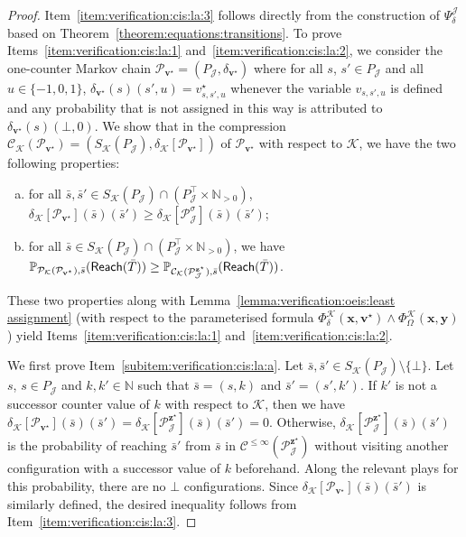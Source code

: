 \documentclass[a4paper,UKenglish,cleveref,autoref,thm-restate,colorlinks]{lipics-v2021}
\newcommand{\IN}{\mathbb{N}}
\newcommand{\INpos}{\IN_{>0}}
\newcommand{\mdpStateSpace}{S}
\newcommand{\weightVal}{u}
\newcommand{\ocCount}{k}
\newcommand{\ocConfig}{s}
\newcommand{\ocTrans}{\delta}
\newcommand{\mchain}{\mathcal{C}}
\newcommand{\ocChain}{\mathcal{P}}
\newcommand{\ocChainFin}[2]{\mchain^{\leq #2}(#1)}
\newcommand{\intPartB}{\mathcal{J}}
\newcommand{\intPartC}{\mathcal{K}}
\newcommand{\cisChainStrat}[1]{\ocChain^{#1}_{\intPartB}}
\newcommand{\cisChain}{\cisChainStrat{\strat}}
\newcommand{\cisChainStateSpace}{P_{\intPartB}}
\newcommand{\cisChainStateSpaceStar}{P_{\intPartB}^{\top}}
\newcommand{\compressCisStateSpace}{\mdpStateSpace_{\intPartC}({\cisChainStateSpace})}
\newcommand{\compressCisTrans}{\ocTrans_{\intPartC}[{\cisChain}]}
\newcommand{\cisConfig}{\bar{\ocConfig}}
\newcommand{\cisConfigB}{\bar{\ocConfig}'}
\newcommand{\varTrans}{x}
\newcommand{\varTransTuple}{\mathbf{\varTrans}}
\newcommand{\varObj}{y}
\newcommand{\varObjTuple}{\mathbf{\varObj}}
\newcommand{\varStrat}{z}
\newcommand{\solStratTuple}{\mathbf{\varStrat}^{\star}}
\newcommand{\varCis}{v}
\newcommand{\solCis}{\varCis^\star}
\newcommand{\solCisTuple}{\mathbf{\varCis}^\star}
\newcommand{\cisChainSymbSol}{\cisChainStrat{\solStratTuple}}
\newcommand{\compressCisSymbSol}{\mchain_{\intPartC}({\cisChainSymbSol})}
\newcommand{\compressCisTransSymbSol}{\ocTrans_{\intPartC}[{\cisChainSymbSol}]}
\newcommand{\formulaTransBase}{\Phi_{\ocTrans}}
\newcommand{\formulaObjBase}{\Phi_{\objective}}
\newcommand{\formulaCisBase}{\Psi_{\ocTrans}}
\newcommand{\formulaCis}{\formulaCisBase^\intPartB}
\newcommand{\formulaCisTrans}{\formulaTransBase^\intPartC}
\newcommand{\formulaCisObj}{\formulaObjBase^\intPartC}
\newcommand{\objective}{\Omega}
\newcommand{\reach}[1]{\mathsf{Reach}(#1)}
\newcommand{\target}{T}
\newcommand{\stratGeneric}[1]{{\sigma_{#1}}}
\newcommand{\strat}{\stratGeneric{}}
\begin{document}
\begin{proof}
  Item~\ref{item:verification:cis:la:3} follows directly from the construction of $\formulaCis$ based on Theorem~\ref{theorem:equations:transitions}.
  To prove Items~\ref{item:verification:cis:la:1} and~\ref{item:verification:cis:la:2}, we consider the one-counter Markov chain $\ocChain_{\solCisTuple} = (\cisChainStateSpace, \ocTrans_{\solCisTuple})$ where for all $\ocConfig$, $\ocConfig'\in\cisChainStateSpace$ and all $\weightVal\in\{-1, 0, 1\}$, $\ocTrans_{\solCisTuple}(\ocConfig)(\ocConfig', \weightVal) = \solCis_{\ocConfig, \ocConfig', \weightVal}$ whenever the variable $\varCis_{\ocConfig, \ocConfig', \weightVal}$ is defined and any probability that is not assigned in this way is attributed to $\ocTrans_{\solCisTuple}(\ocConfig)(\bot, 0)$.
  We show that in the compression $\mchain_\intPartC(\ocChain_{\solCisTuple}) = (\compressCisStateSpace, \ocTrans_{\intPartC}[\ocChain_{\solCisTuple}])$ of $\ocChain_{\solCisTuple}$ with respect to $\intPartC$, we have the two following properties: \begin{enumerate}[a.]
  \item for all $\cisConfig, \cisConfigB\in\compressCisStateSpace\cap(\cisChainStateSpaceStar\times\INpos)$, $\ocTrans_{\intPartC}[\ocChain_{\solCisTuple}](\cisConfig)(\cisConfigB)\geq\compressCisTrans(\cisConfig)(\cisConfigB)$;\label{subitem:verification:cis:la:a}
  \item for all $\cisConfig\in\compressCisStateSpace\cap(\cisChainStateSpaceStar\times\INpos)$, we have $\probaMCverb{\ocChain_{\intPartC}(\ocChain_{\solCisTuple})}{\cisConfig}(\reach{\bar{\target}})\geq\probaMCverb{\compressCisSymbSol}{\cisConfig}(\reach{\bar{\target}})$.\label{subitem:verification:cis:la:b}
  \end{enumerate}
  These two properties along with Lemma~\ref{lemma:verification:oeis:least assignment} (with respect to the parameterised formula $\formulaCisTrans(\varTransTuple, \solCisTuple)\land\formulaCisObj(\varTransTuple,\varObjTuple)$) yield Items~\ref{item:verification:cis:la:1} and~\ref{item:verification:cis:la:2}.

  We first prove Item~\ref{subitem:verification:cis:la:a}.
  Let $\cisConfig, \cisConfigB\in\compressCisStateSpace\setminus\{\bot\}$.
  Let $\ocConfig$, $\ocConfig\in\cisChainStateSpace$ and $\ocCount, \ocCount'\in\IN$ such that $\cisConfig=(\ocConfig, \ocCount)$ and $\cisConfigB=(\ocConfig', \ocCount')$.
  If $\ocCount'$ is not a successor counter value of $\ocCount$ with respect to $\intPartC$, then we have $\ocTrans_{\intPartC}[\ocChain_{\solCisTuple}](\cisConfig)(\cisConfigB) = \compressCisTransSymbSol(\cisConfig)(\cisConfigB) = 0$.
  Otherwise, $\compressCisTransSymbSol(\cisConfig)(\cisConfigB)$ is the probability of reaching $\cisConfigB$ from $\cisConfig$ in $\ocChainFin{\cisChainSymbSol}{\infty}$ without visiting another configuration with a successor value of $\ocCount$ beforehand.
  Along the relevant plays for this probability, there are no $\bot$ configurations.
  Since $\ocTrans_{\intPartC}[\ocChain_{\solCisTuple}](\cisConfig)(\cisConfigB)$ is similarly defined, the desired inequality follows from Item~\ref{item:verification:cis:la:3}.


\end{proof}
\end{document}
